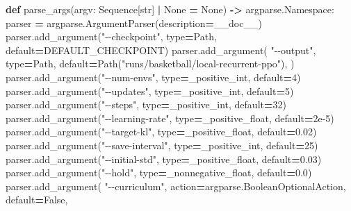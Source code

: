 \documentclass[
  american,
  11pt,
  letterpaper,
]{article}
\newenvironment{Shaded}{\begin{snugshade}}{\end{snugshade}}
\newcommand{\BuiltInTok}[1]{#1}
\newcommand{\DecValTok}[1]{\textcolor[rgb]{0.00,0.00,0.81}{#1}}
\newcommand{\FloatTok}[1]{\textcolor[rgb]{0.00,0.00,0.81}{#1}}
\newcommand{\KeywordTok}[1]{\textcolor[rgb]{0.13,0.29,0.53}{\textbf{#1}}}
\newcommand{\NormalTok}[1]{#1}
\newcommand{\OperatorTok}[1]{\textcolor[rgb]{0.81,0.36,0.00}{\textbf{#1}}}
\newcommand{\StringTok}[1]{\textcolor[rgb]{0.31,0.60,0.02}{#1}}
\newcommand{\VariableTok}[1]{\textcolor[rgb]{0.00,0.00,0.00}{#1}}
\renewenvironment{Shaded}{\par\smallskip}{\par\smallskip}
\begin{document}
\begin{Shaded}
\begin{Highlighting}[]
\KeywordTok{def}\NormalTok{ parse\_args(argv: Sequence[}\BuiltInTok{str}\NormalTok{] }\OperatorTok{|} \VariableTok{None} \OperatorTok{=} \VariableTok{None}\NormalTok{) }\OperatorTok{{-}\textgreater{}}\NormalTok{ argparse.Namespace:}
\NormalTok{    parser }\OperatorTok{=}\NormalTok{ argparse.ArgumentParser(description}\OperatorTok{=}\NormalTok{\_\_doc\_\_)}
\NormalTok{    parser.add\_argument(}\StringTok{"{-}{-}checkpoint"}\NormalTok{, }\BuiltInTok{type}\OperatorTok{=}\NormalTok{Path, default}\OperatorTok{=}\NormalTok{DEFAULT\_CHECKPOINT)}
\NormalTok{    parser.add\_argument(}
        \StringTok{"{-}{-}output"}\NormalTok{,}
        \BuiltInTok{type}\OperatorTok{=}\NormalTok{Path,}
\NormalTok{        default}\OperatorTok{=}\NormalTok{Path(}\StringTok{"runs/basketball/local{-}recurrent{-}ppo"}\NormalTok{),}
\NormalTok{    )}
\NormalTok{    parser.add\_argument(}\StringTok{"{-}{-}num{-}envs"}\NormalTok{, }\BuiltInTok{type}\OperatorTok{=}\NormalTok{\_positive\_int, default}\OperatorTok{=}\DecValTok{4}\NormalTok{)}
\NormalTok{    parser.add\_argument(}\StringTok{"{-}{-}updates"}\NormalTok{, }\BuiltInTok{type}\OperatorTok{=}\NormalTok{\_positive\_int, default}\OperatorTok{=}\DecValTok{5}\NormalTok{)}
\NormalTok{    parser.add\_argument(}\StringTok{"{-}{-}steps"}\NormalTok{, }\BuiltInTok{type}\OperatorTok{=}\NormalTok{\_positive\_int, default}\OperatorTok{=}\DecValTok{32}\NormalTok{)}
\NormalTok{    parser.add\_argument(}\StringTok{"{-}{-}learning{-}rate"}\NormalTok{, }\BuiltInTok{type}\OperatorTok{=}\NormalTok{\_positive\_float, default}\OperatorTok{=}\FloatTok{2e{-}5}\NormalTok{)}
\NormalTok{    parser.add\_argument(}\StringTok{"{-}{-}target{-}kl"}\NormalTok{, }\BuiltInTok{type}\OperatorTok{=}\NormalTok{\_positive\_float, default}\OperatorTok{=}\FloatTok{0.02}\NormalTok{)}
\NormalTok{    parser.add\_argument(}\StringTok{"{-}{-}save{-}interval"}\NormalTok{, }\BuiltInTok{type}\OperatorTok{=}\NormalTok{\_positive\_int, default}\OperatorTok{=}\DecValTok{25}\NormalTok{)}
\NormalTok{    parser.add\_argument(}\StringTok{"{-}{-}initial{-}std"}\NormalTok{, }\BuiltInTok{type}\OperatorTok{=}\NormalTok{\_positive\_float, default}\OperatorTok{=}\FloatTok{0.03}\NormalTok{)}
\NormalTok{    parser.add\_argument(}\StringTok{"{-}{-}hold"}\NormalTok{, }\BuiltInTok{type}\OperatorTok{=}\NormalTok{\_nonnegative\_float, default}\OperatorTok{=}\FloatTok{0.0}\NormalTok{)}
\NormalTok{    parser.add\_argument(}
        \StringTok{"{-}{-}curriculum"}\NormalTok{,}
\NormalTok{        action}\OperatorTok{=}\NormalTok{argparse.BooleanOptionalAction,}
\NormalTok{        default}\OperatorTok{=}\VariableTok{False}\NormalTok{,}

\end{Highlighting}
\end{Shaded}
\end{document}
